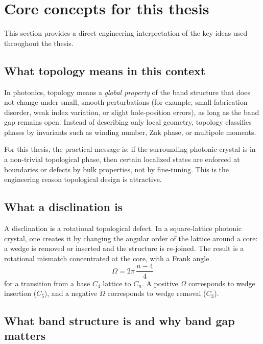 \documentclass[12pt,a4paper,oneside]{book}
\theoremstyle{plain}
\theoremstyle{definition}
\theoremstyle{remark}
\begin{document}
\section{Core concepts for this thesis}
\label{sec:core-concepts}

This section provides a direct engineering interpretation of the key ideas used throughout the thesis.

\subsection{What topology means in this context}

In photonics, topology means a \emph{global property} of the band structure that does not change under small, smooth perturbations (for example, small fabrication disorder, weak index variation, or slight hole-position errors), as long as the band gap remains open. Instead of describing only local geometry, topology classifies phases by invariants such as winding number, Zak phase, or multipole moments.

For this thesis, the practical message is: if the surrounding photonic crystal is in a non-trivial topological phase, then certain localized states are enforced at boundaries or defects by bulk properties, not by fine-tuning. This is the engineering reason topological design is attractive.

\subsection{What a disclination is}

A disclination is a rotational topological defect. In a square-lattice photonic crystal, one creates it by changing the angular order of the lattice around a core: a wedge is removed or inserted and the structure is re-joined. The result is a rotational mismatch concentrated at the core, with a Frank angle
\begin{equation}
  \Omega = 2\pi\,\frac{n-4}{4}
\end{equation}
for a transition from a base $C_4$ lattice to $C_n$. A positive $\Omega$ corresponds to wedge insertion ($C_5$), and a negative $\Omega$ corresponds to wedge removal ($C_3$).

\subsection{What band structure is and why band gap matters}
\end{document}
